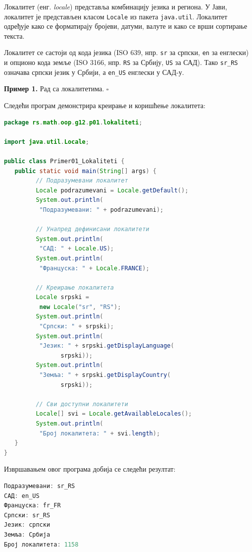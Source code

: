 Локалитет (енг. \textit{locale}) представља комбинацију језика и региона. У Јави, локалитет је представљен класом \texttt{Locale} из пакета \texttt{java.util}. Локалитет одређује како се форматирају бројеви, датуми, валуте и како се врши сортирање текста.

Локалитет се састоји од кода језика (ISO 639, нпр. \texttt{sr} за српски, \texttt{en} за енглески) и опционо кода земље (ISO 3166, нпр. \texttt{RS} за Србију, \texttt{US} за САД). Тако \texttt{sr\_RS} означава српски језик у Србији, а \texttt{en\_US} енглески у САД-у.


\bigskip

\noindent \textbf{Пример 1.} Рад са локалитетима. $\square$

\medskip

Следећи програм демонстрира креирање и коришћење локалитета:


\begin{lstlisting}[language=Java]
package rs.math.oop.g12.p01.lokaliteti;
 
import java.util.Locale;
 
public class Primer01_Lokaliteti {
   public static void main(String[] args) {
         // Подразумевани локалитет
         Locale podrazumevani = Locale.getDefault();
         System.out.println(
          "Подразумевани: " + podrazumevani);
 
         // Унапред дефинисани локалитети
         System.out.println(
          "САД: " + Locale.US);
         System.out.println(
          "Француска: " + Locale.FRANCE);
 
         // Креирање локалитета
         Locale srpski =
          new Locale("sr", "RS");
         System.out.println(
          "Српски: " + srpski);
         System.out.println(
          "Језик: " + srpski.getDisplayLanguage(
                srpski));
         System.out.println(
          "Земља: " + srpski.getDisplayCountry(
                srpski));
 
         // Сви доступни локалитети
         Locale[] svi = Locale.getAvailableLocales();
         System.out.println(
          "Број локалитета: " + svi.length);
   }
}
\end{lstlisting}


Извршавањем овог програма добија се следећи резултат:


\begin{lstlisting}[language=Java]
Подразумевани: sr_RS
САД: en_US
Француска: fr_FR
Српски: sr_RS
Језик: српски
Земља: Србија
Број локалитета: 1158
\end{lstlisting}


